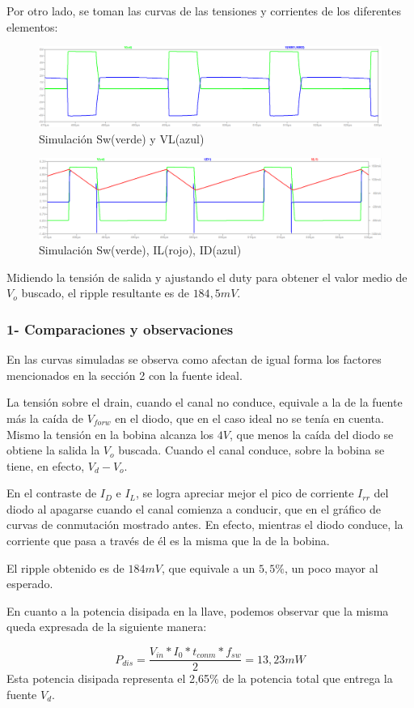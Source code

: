\documentclass[e4_tp1_main.tex]{subfiles}
\begin{document}
Por otro lado, se toman las curvas de las tensiones y corrientes de los diferentes elementos:

\begin{figure}[H]
\centering
\includegraphics[width=1\linewidth]{Imagenes/Punto3/SW&VL}
\caption{Simulación Sw(verde) y VL(azul)}
\end{figure}

\begin{figure}[H]
\centering
\includegraphics[width=1\linewidth]{Imagenes/Punto3/SW&IL&ID}
\caption{Simulación Sw(verde), IL(rojo), ID(azul)}
\end{figure}

Midiendo la tensión de salida y ajustando el duty para obtener el valor medio de $V_o$ buscado, el ripple resultante es de $184,5mV$.

\subsubsection*{1- Comparaciones y observaciones}

En las curvas simuladas se observa como afectan de igual forma los factores mencionados en la sección 2 con la fuente ideal.\par
La tensión sobre el drain, cuando el canal no conduce, equivale a la de la fuente más la caída de $V_{forw}$ en el diodo, que en el caso ideal no se tenía en cuenta. Mismo la tensión en la bobina alcanza los $4V$, que menos la caída del diodo se obtiene la salida la $V_o$ buscada. Cuando el canal conduce, sobre la bobina se tiene, en efecto, $V_d-V_o$.
\par
En el contraste de $I_D$ e $I_L$, se logra apreciar mejor el pico de corriente $I_{rr}$ del diodo al apagarse cuando el canal comienza a conducir, que en el gráfico de curvas de conmutación mostrado antes. En efecto, mientras el diodo conduce, la corriente que pasa a través de él es la misma que la de la bobina.
\par
El ripple obtenido es de $184mV$, que equivale a un $5,5\%$, un poco mayor al esperado.
\par
En cuanto a la potencia disipada en la llave, podemos observar que la misma queda expresada de la siguiente manera:\par
\[ 
P_{dis} = \frac{V_{in}*I_0*t_{conm}*f_{sw}}{2} = 13,23 mW  \] 
Esta potencia disipada representa el 2,65\% de la potencia total que entrega la fuente $V_d$.

\newpage
\end{document}
